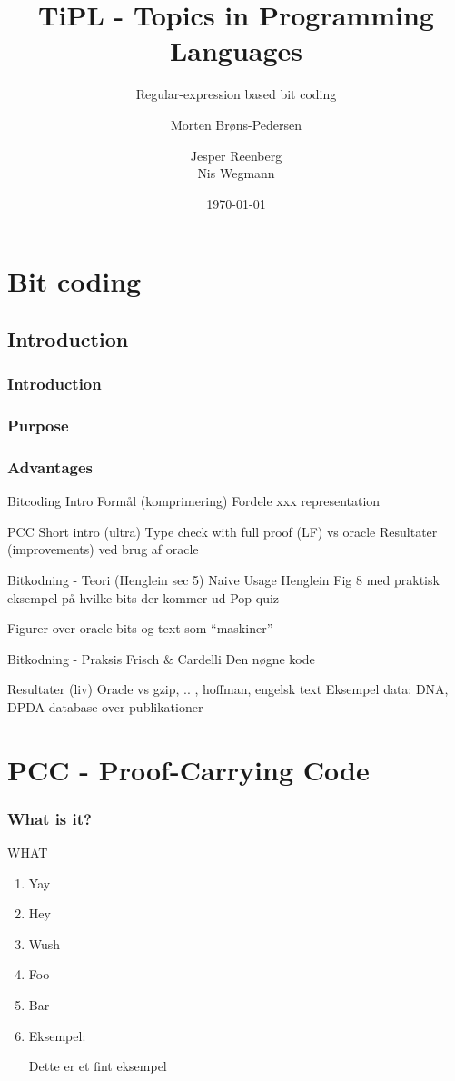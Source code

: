 \documentclass[slidestop,compress,mathserif]{beamer}
\title[]{TiPL - Topics in Programming Languages}
\subtitle{Regular-expression based bit coding}
\author[Morten Brøns-Pedersen \and Jesper Reenberg \and Nis Wegmann]
       {Morten Brøns-Pedersen \and
        Jesper Reenberg  \\
        Nis Wegmann }
\institute[DIKU]{Department of Computer Science}
\date[]{\today}
\begin{document}
\frame[plain]{\titlepage}

\section{Bit coding}

\subsection{Introduction}

\begin{frame}
  \frametitle{Introduction}

\end{frame}

\begin{frame}
  \frametitle{Purpose}
  
\end{frame}

\begin{frame}
  \frametitle{Advantages}
  
\end{frame}



Bitcoding
   Intro
     Formål (komprimering)
     Fordele
     xxx representation

PCC
     Short intro (ultra)
     Type check with full proof (LF) vs oracle
     Resultater (improvements) ved brug af oracle

Bitkodning - Teori (Henglein sec 5)
     Naive Usage 
     Henglein Fig 8 med praktisk eksempel på hvilke bits der kommer ud
     Pop quiz

     Figurer over oracle bits og text som ``maskiner''

Bitkodning - Praksis
     Frisch & Cardelli
     Den nøgne kode

Resultater (liv)     
     Oracle vs gzip, .. , hoffman, engelsk text
     Eksempel data: DNA, DPDA database over publikationer

\section{PCC - Proof-Carrying Code}
\begin{frame}
\frametitle{What is it?}
 WHAT

 \begin{enumerate}
 \item<1> Yay
 \item<2> Hey
 \item<3> Wush
 \item<4> Foo
 \item<5> Bar
 \item<6>{ Eksempel:
   \begin{example}
     Dette er et fint eksempel
   \end{example}}

 \end{enumerate}
\end{frame}
\end{document}

